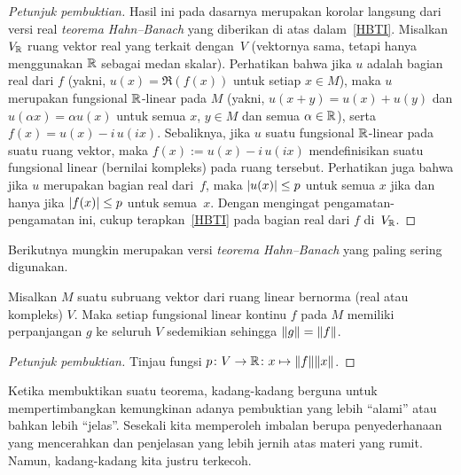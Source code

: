\begin{proof}[\emph{Petunjuk pembuktian}] Hasil ini pada dasarnya merupakan korolar langsung dari versi real
\emph{teorema Hahn--Banach} yang diberikan di atas dalam~\ref{HBTI}. Misalkan $V_{\mathbb{R}}$ ruang vektor real yang terkait dengan~$V$ (vektornya sama,
tetapi hanya menggunakan $\mathbb{R}$ sebagai medan skalar). Perhatikan bahwa jika $u$ adalah bagian real dari $f$ (yakni,
$u(x) = \Re(f(x))$ untuk setiap $x \in M$), maka $u$ merupakan fungsional $\mathbb{R}$-linear pada $M$ (yakni, $u(x + y) = u(x) + u(y)$ dan $u(\alpha x) = \alpha u(x)$
untuk semua $x$, $y \in M$ dan semua $\alpha \in \mathbb{R}$), serta $f(x) = u(x) - i\,u(ix)$. Sebaliknya, jika $u$ suatu fungsional $\mathbb{R}$-linear pada suatu ruang vektor,
maka $f(x) := u(x) - i\,u(ix)$ mendefinisikan suatu fungsional linear (bernilai kompleks) pada ruang tersebut. Perhatikan juga bahwa jika $u$ merupakan bagian real dari~$f$,
maka $\lvert u(x)\rvert \le p$ untuk semua $x$ jika dan hanya jika $\lvert f(x)\rvert \le p$ untuk semua~$x$. Dengan mengingat pengamatan-pengamatan ini, cukup terapkan~\ref{HBTI}
pada bagian real dari $f$ di~$V_{\mathbb{R}}$. \ns
\end{proof}

Berikutnya mungkin merupakan versi \emph{teorema Hahn--Banach} yang paling sering digunakan.

\begin{thm}\label{HBTIII} Misalkan $M$ suatu subruang vektor dari ruang linear bernorma (real atau
kompleks) $V$. Maka setiap fungsional linear kontinu $f$ pada $M$ memiliki
perpanjangan $g$ ke seluruh $V$ sedemikian sehingga $\lVert g\rVert = \lVert f\rVert$.
\end{thm}

\begin{proof}[\emph{Petunjuk pembuktian}] Tinjau fungsi $p\colon V \rightarrow \mathbb{R} \colon x \mapsto \lVert f\rVert \lVert x\rVert$. \ns
\end{proof}

Ketika membuktikan suatu teorema, kadang-kadang berguna untuk mempertimbangkan kemungkinan adanya pembuktian yang lebih ``alami'' atau bahkan lebih ``jelas''.
Sesekali kita memperoleh imbalan berupa penyederhanaan yang mencerahkan dan penjelasan yang lebih jernih atas materi yang rumit. Namun, kadang-kadang kita justru terkecoh.

